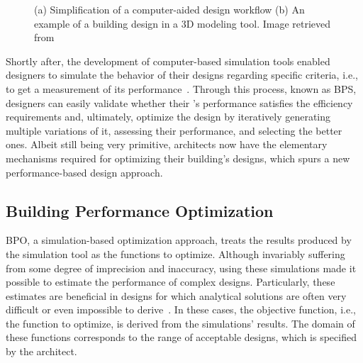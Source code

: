 \begin{figure}[htbp]
\centering
{}%
\hfill
{}%

\caption[General views of Traditional Design Approaches]{(a) Simplification of a computer-aided design workflow (b) An example of a building design in a 3D modeling tool. Image retrieved from~\cite{3DMODELTOOL}}
\label{fig:traditionaldesign}
\end{figure}

Shortly after, the development of computer-based simulation tools enabled designers to simulate the behavior of their designs regarding specific criteria, i.e., to get a measurement of its performance~\cite{Malkawi2005}. Through this process, known as \ac{BPS}, designers can easily validate whether their 's performance satisfies the efficiency requirements and, ultimately, optimize the design by iteratively generating multiple variations of it, assessing their performance, and selecting the better ones. Albeit still being very primitive, architects now have the elementary mechanisms required for optimizing their building's designs, which spurs a new performance-based design approach.

\subsection{Building Performance Optimization}

	\ac{BPO}, a simulation-based optimization approach, treats the results produced by the simulation tool as the functions to optimize. Although invariably suffering from some degree of imprecision and inaccuracy, using these simulations made it possible to estimate the performance of complex designs. Particularly, these estimates are beneficial in designs for which analytical solutions are often very difficult or even impossible to derive~\cite{Kolda2003}. In these cases, the objective function, i.e., the function to optimize, is derived from the simulations' results. The domain of these functions corresponds to the range of acceptable designs,  which is specified by the architect.

